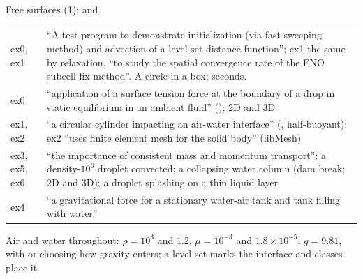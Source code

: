 \documentclass[aspectratio=169,11pt]{beamer}
\begin{document}
\begin{frame}{Free surfaces (1):  and }
\label{fr:multiphase}
\scriptsize
\setlength{\tabcolsep}{3pt}
\begin{tabular}{@{}L{0.2\textwidth}L{0.76\textwidth}@{}}
\toprule
{} ex0, ex1 & ``A test program to demonstrate initialization (via fast-sweeping method) and advection of a level set distance function''; ex1 the same by relaxation, ``to study the spatial convergence rate of the ENO subcell-fix method''. A circle in a box; seconds.\\
 ex0 & ``application of a surface tension force at the boundary of a drop in static equilibrium in an ambient fluid'' (); 2D and 3D\\
ex1, ex2 & ``a circular cylinder impacting an air-water interface'' (,  half-buoyant); ex2 ``uses finite element mesh for the solid body'' (libMesh)\\
ex3, ex5, ex6 & ``the importance of consistent mass and momentum transport'': a density-$10^6$ droplet convected; a collapsing water column (dam break; 2D and 3D); a droplet splashing on a thin liquid layer\\
ex4 & ``a gravitational force for a stationary water-air tank and tank filling with water''\\
\bottomrule
\end{tabular}
\vspace{1mm}

\scriptsize Air and water throughout: $\rho = 10^3$ and $1.2$, $\mu = 10^{-3}$ and $1.8\times10^{-5}$, $g = 9.81$, with  or  choosing how gravity enters; a level set marks the interface and  classes place it.
\end{frame}
\end{document}
